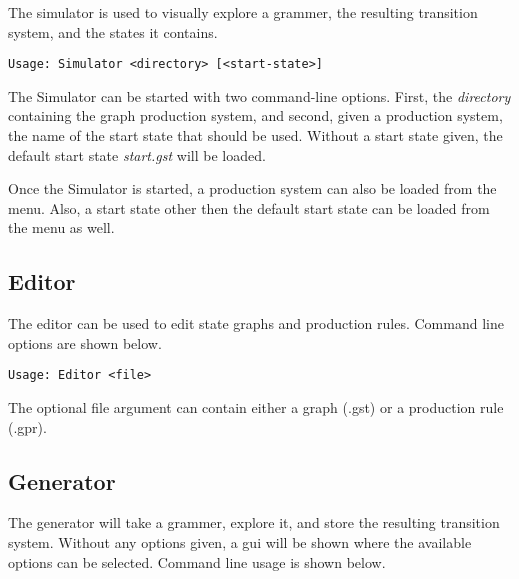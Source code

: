 The simulator is used to visually explore a grammer, the resulting transition system, and the states it contains.

\begin{verbatim}
Usage: Simulator <directory> [<start-state>]
\end{verbatim}

The Simulator can be started with two command-line options. First, the \emph{directory} containing the graph production system, and second, given a production system, the name of the start state that should be used. Without a start state given, the default start state \emph{start.gst} will be loaded.

Once the Simulator is started, a production system can also be loaded from the menu. Also, a start state other then the default start state can be loaded from the menu as well.

\subsection{Editor}

The editor can be used to edit state graphs and production rules. Command line options are shown below.

\begin{verbatim}
Usage: Editor <file>
\end{verbatim}

The optional file argument can contain either a graph (.gst) or a production rule (.gpr).

\subsection{Generator}

The generator will take a grammer, explore it, and store the resulting transition system. Without any options given, a gui will be shown where the available options can be selected. Command line usage is shown below.


